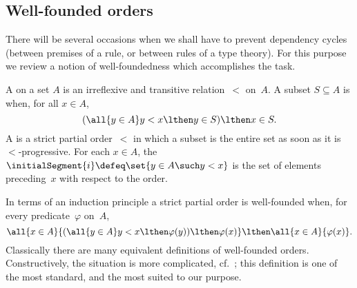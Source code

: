 \subsection{Well-founded orders}

There will be several occasions when we shall have to prevent dependency cycles (between premises of a rule, or between rules of a type theory). For this purpose we review a notion of well-foundedness which accomplishes the task.

\begin{definition}
  \label{def:well-founded-order}%
  A  on a set $A$ is an irreflexive and transitive relation~$<$ on~$A$.
  A subset $S \subseteq A$ is  when, for all $x \in A$,
  \begin{equation*}
    (\all{y \in A} y < x \lthen y \in S) \lthen x \in S.
  \end{equation*}
  A  is a strict partial order~$<$ in which a subset is the entire set as soon as it is $<$-progressive.
  For each $x \in A$, the  $\initialSegment{i} \defeq \set{y \in A \such y < x}$ is the set of elements preceding~$x$ with respect to the order.
\end{definition}

\noindent
In terms of an induction principle a strict partial order is well-founded when, for every predicate~$\varphi$ on~$A$,
%
\begin{equation*}
  \all{x \in A}{
    (\all{y \in A} y < x \lthen \varphi(y)) \lthen \varphi(x)
  } \lthen
  \all{x \in A}{\varphi(x)}.
\end{equation*}
%
Classically there are many equivalent definitions of well-founded orders.
%
Constructively, the situation is more complicated, cf.\ \cite[]{taylor:practical-foundations}; this definition is one of the most standard, and the most suited to our purpose. 


